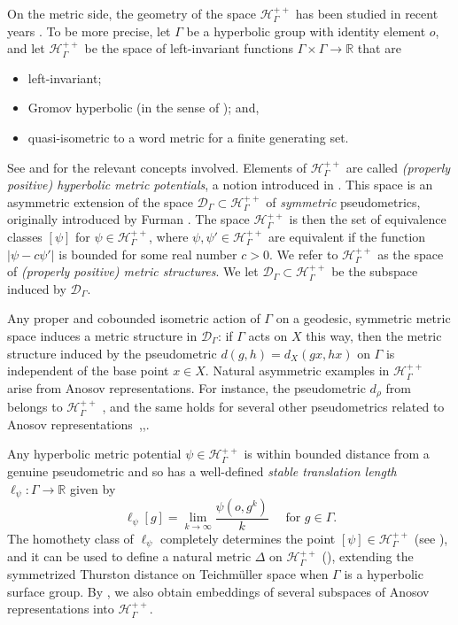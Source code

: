 \documentclass[twoside]{amsart}
\theoremstyle{definition}
\numberwithin{equation}{section}
\numberwithin{theorem}{section}
\newcommand{\R}{\mathbb{R}}
\newcommand{\calD}{\mathcal{D}}
\newcommand{\calH}{\mathcal{H}}
\newcommand{\scrD}{\mathscr{D}}
\newcommand{\scrH}{\mathscr{H}}
\newcommand{\G}{\Gamma}
\newcommand{\Del}{\Delta}
\newcommand{\p}{\psi}
\newcommand{\ra}{\rightarrow}
\begin{document}
On the metric side, the geometry of the space $\scrH_\G^{++}$ has been studied in recent years \cite{oregonreyes.metric,cantrell-reyes.manhattan,CRS}. 
 To be more precise, let $\G$ be a hyperbolic group with identity element $o$, and let $\calH_\G^{++}$ be the space of left-invariant functions $\G\times \G \ra \R$ that are
\begin{itemize}
    \item left-invariant;
    \item Gromov hyperbolic (in the sense of ); and,
    \item quasi-isometric to a word metric for a finite generating set.
\end{itemize}
See  and  for the relevant concepts involved. Elements of $\calH_\G^{++}$ are called \emph{(properly positive) hyperbolic metric potentials}, a notion introduced in \cite{CRS}. This space is an asymmetric extension of the space $\calD_\G\subset \calH_\G^{++}$ of \emph{symmetric} pseudometrics, originally introduced by Furman \cite{furman}. The space $\scrH^{++}_\G$ is then the set of equivalence classes $[\p]$ for $\p\in \calH^{++}_\G$, where $\p,\p'\in \calH^{++}_\G$ are equivalent if the function $|\p-c\p'|$ is bounded for some real number $c>0$. We refer to $\scrH^{++}_\G$ as the space of  \emph{(properly positive) metric structures}. We let $\scrD_\G\subset \scrH_\G^{++}$ be the subspace induced by $\calD_\G$.

Any proper and cobounded isometric action of $\G$ on a geodesic, symmetric metric space induces a metric structure in $\scrD_\G$: if $\G$ acts on $X$ this way, then the metric structure induced by the pseudometric $d(g,h)=d_X(gx,hx)$ on $\G$ is independent of the base point $x\in X$. Natural asymmetric examples in $\scrH_\G^{++}$ arise from Anosov representations. For  instance, the pseudometric $d_{\rho}$ from  belongs to $\calH_\G^{++}$ \cite[Lemma~7.1]{cantrell-tanaka.invariant}, and the same holds for several other pseudometrics related to Anosov representations~\cite[Corollary~4.8]{dey-kapovich},\cite[Corollary~6.8]{CRS},\cite[Proposition~9.7]{KMG26:Horoboundary}. 

Any hyperbolic metric potential $\p\in \calH_\G^{++}$ is within bounded distance from a genuine pseudometric and so has a well-defined \emph{stable translation length} $\ell_\p:\G \ra \R$ given by
\[\ell_\p[g]=\lim_{k\to \infty}\frac{\p(o,g^k)}{k} \quad \text{ for }g\in \G.\]
The homothety class of $\ell_{\p}$ completely determines the point $[\p]\in \scrH_\G^{++}$ (see ), and it can be used to define a natural metric $\Del$ on $\scrH^{++}_\G$ (), extending the symmetrized Thurston distance on Teichm\"uller space when $\G$ is a hyperbolic surface group. By \cite{BCLS.pressure,CDPW}, we also obtain embeddings of several subspaces of %
Anosov representations into $\scrH_\G^{++}$.
\end{document}
